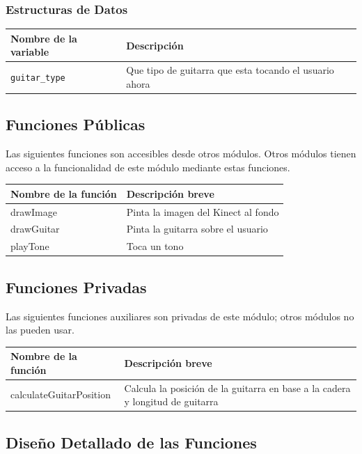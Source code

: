 \documentclass[a4paper,10pt]{article}
\begin{document}
\subsubsection{Estructuras de Datos}
\begin{tabular}{| p{30mm} | p{10cm} |}
        \hline
        \textbf{Nombre de la \mbox{variable}} & \textbf{Descripción} \\
        \hline
        \texttt{guitar\_type} & Que tipo de guitarra que esta tocando el usuario ahora\\
        \hline
\end{tabular}
\subsection{Funciones Públicas}
Las siguientes funciones son accesibles desde otros módulos. Otros módulos
tienen acceso a la funcionalidad de este módulo mediante estas funciones.~\\

\begin{tabular}{| p{30mm} | p{10cm} |}
        \hline
        \textbf{Nombre de la \mbox{función}} & \textbf{Descripción breve} \\
        \hline
        drawImage & Pinta la imagen del Kinect al fondo \\
        \hline
        drawGuitar & Pinta la guitarra sobre el usuario \\
        \hline
        playTone & Toca un tono \\
        \hline
\end{tabular}

\subsection{Funciones Privadas}
Las siguientes funciones auxiliares son privadas de este módulo; otros módulos
no las pueden usar.~\\

\begin{tabular}{| p{30mm} | p{10cm} |}
        \hline
        \textbf{Nombre de la \mbox{función}} & \textbf{Descripción breve} \\
        \hline
        calculateGuitarPosition & Calcula la posición de la guitarra en base a la cadera y longitud de guitarra \\
        \hline
\end{tabular}
\subsection{Diseño Detallado de las Funciones}
\end{document}
